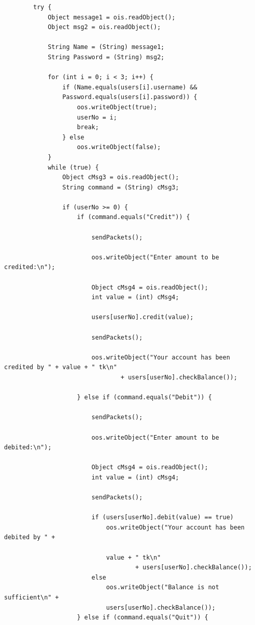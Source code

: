 \documentclass[11pt]{article}
\begin{document}
\begin{verbatim}
        try {
            Object message1 = ois.readObject();
            Object msg2 = ois.readObject();

            String Name = (String) message1;
            String Password = (String) msg2;

            for (int i = 0; i < 3; i++) {
                if (Name.equals(users[i].username) && 
                Password.equals(users[i].password)) {
                    oos.writeObject(true);
                    userNo = i;
                    break;
                } else
                    oos.writeObject(false);
            }
            while (true) {
                Object cMsg3 = ois.readObject();
                String command = (String) cMsg3;

                if (userNo >= 0) {
                    if (command.equals("Credit")) {

                        sendPackets();

                        oos.writeObject("Enter amount to be credited:\n");

                        Object cMsg4 = ois.readObject();
                        int value = (int) cMsg4;

                        users[userNo].credit(value);

                        sendPackets();

                        oos.writeObject("Your account has been credited by " + value + " tk\n"
                                + users[userNo].checkBalance());

                    } else if (command.equals("Debit")) {

                        sendPackets();

                        oos.writeObject("Enter amount to be debited:\n");

                        Object cMsg4 = ois.readObject();
                        int value = (int) cMsg4;

                        sendPackets();

                        if (users[userNo].debit(value) == true)
                            oos.writeObject("Your account has been debited by " +
                            
                            value + " tk\n"
                                    + users[userNo].checkBalance());
                        else
                            oos.writeObject("Balance is not sufficient\n" + 
                            users[userNo].checkBalance());
                    } else if (command.equals("Quit")) {


\end{verbatim}
\end{document}
